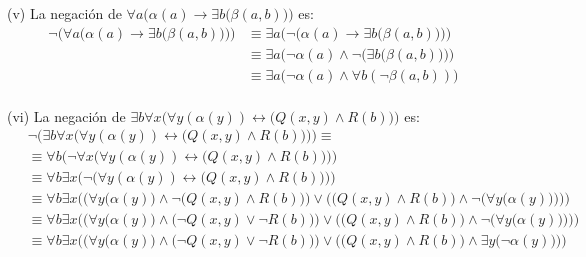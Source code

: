 \documentclass[letterpaper,DIV=14,headsepline,12pt]{scrartcl}
\makeatletter
\newenvironment{solu}[1][]{%
        \par\pushQED{\hfill \lozenge}%
        \normalfont\topsep6pt \partopsep0pt %
        \trivlist
        \item[\hskip\labelsep
                \textbf{\textit{Solución.}}%
        ]#1
        }{%
        \popQED\endtrivlist\@endpefalse
    }
\makeatother
\begin{document}
\begin{solu}
        (v) La negación de $\forall a \big(\alpha(a) \to \exists b \big( \beta(a,b) \big) \big)$ es:
        \begin{align*}
            \lnot \Big( \forall a \big(\alpha(a) \to \exists b \big( \beta(a,b) \big) \big) \Big) & \equiv \exists a \Big( \lnot \big(\alpha(a) \to \exists b \big( \beta(a,b) \big) \big) \Big) &\tag*{Negación de $\forall$} \\
            & \equiv \exists a \Big( \lnot \alpha(a) \land \lnot \big(\exists b \big( \beta(a,b) \big) \big) \Big) &\tag*{Negación de $\to$} \\
            & \equiv \exists a \big( \lnot \alpha(a) \land \forall b (  \lnot \beta(a,b) ) \big) &\tag*{Negación de $\exists$} \\
        \end{align*}
        
        (vi) La negación de $\exists b \forall x \big( \forall y(\alpha(y)) \leftrightarrow \big( Q(x,y) \land R(b) \big) \big)$ es:
        \begin{align*}
            & \; \lnot \Big(\exists b \forall x \big( \forall y(\alpha(y)) \leftrightarrow \big( Q(x,y) \land R(b) \big) \big)\Big) \equiv \\
            & \; \equiv \forall b  \Big( \lnot \forall x \big( \forall y(\alpha(y)) \leftrightarrow \big( Q(x,y) \land R(b) \big) \big)\Big) \tag*{Negación de $\exists$} \\
            & \; \equiv \forall b  \exists x \Big( \lnot \Big( \forall y(\alpha(y)) \leftrightarrow \big( Q(x,y) \land R(b) \big) \Big)\Big) \tag*{Negación de $\forall$} \\
            & \; \equiv \forall b  \exists x \bigg( \Big( \forall y \big( \alpha(y) \big) \land \lnot \big( Q(x,y) \land R(b) \big) \Big) \lor \Big( \big( Q(x,y) \land R(b) \big) \land \lnot \big( \forall y \big( \alpha(y) \big) \big) \Big) \bigg) \tag*{Negación de $\leftrightarrow$, inciso (i)} \\
            & \; \equiv \forall b  \exists x \bigg( \Big( \forall y \big( \alpha(y) \big) \land \big( \lnot Q(x,y) \lor \lnot R(b) \big) \Big) \lor \Big( \big( Q(x,y) \land R(b) \big) \land \lnot \big( \forall y \big( \alpha(y) \big) \big) \Big) \bigg) \tag*{Ley de De Morgan} \\
            & \; \equiv \forall b  \exists x \bigg( \Big( \forall y \big( \alpha(y) \big) \land \big( \lnot Q(x,y) \lor \lnot R(b) \big) \Big) \lor \Big( \big( Q(x,y) \land R(b) \big) \land \exists y \big( \lnot \alpha(y) \big) \Big) \bigg) \tag*{Negación de $\forall$}
        \end{align*}
        

\end{solu}
\end{document}
